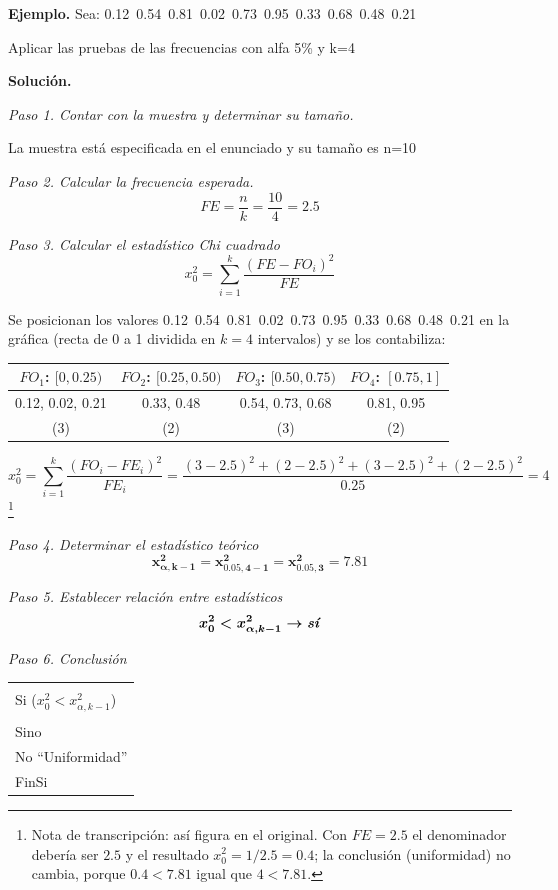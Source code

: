 \documentclass[11pt,letterpaper]{report}
\newenvironment{algoritmo}
  {\begin{center}\begin{tabular}{|p{0.85\textwidth}|}\hline\vspace{-0.2cm}\begin{tabbing}\hspace{0.6cm}\=\hspace{0.6cm}\=\hspace{0.6cm}\=\hspace{0.6cm}\=\hspace{0.6cm}\=\kill}
  {\end{tabbing}\vspace{-0.4cm}\\\hline\end{tabular}\end{center}}
\begin{document}
\textbf{Ejemplo.} Sea: 0.12\ 0.54\ 0.81\ 0.02\ 0.73\ 0.95\ 0.33\ 0.68\ 0.48\ 0.21

Aplicar las pruebas de las frecuencias con alfa 5\% y k=4

\textbf{Solución.}

\textit{Paso 1. Contar con la muestra y determinar su tamaño.}

La muestra está especificada en el enunciado y su tamaño es n=10

\textit{Paso 2. Calcular la frecuencia esperada.}
\[
FE = \frac{n}{k} = \frac{10}{4} = 2.5
\]

\textit{Paso 3. Calcular el estadístico Chi cuadrado}
\[
x_0^2 = \sum_{i=1}^{k} \frac{(FE - FO_i)^2}{FE}
\]

Se posicionan los valores 0.12\ 0.54\ 0.81\ 0.02\ 0.73\ 0.95\ 0.33\ 0.68\ 0.48\ 0.21 en la gráfica (recta de 0 a 1 dividida en $k = 4$ intervalos) y se los contabiliza:

\begin{table}[H]
\centering
\begin{tabular}{|c|c|c|c|}
\hline
$FO_1$: $[0, 0.25)$ & $FO_2$: $[0.25, 0.50)$ & $FO_3$: $[0.50, 0.75)$ & $FO_4$: $[0.75, 1]$\\
\hline
0.12, 0.02, 0.21 & 0.33, 0.48 & 0.54, 0.73, 0.68 & 0.81, 0.95\\
(3) & (2) & (3) & (2)\\
\hline
\end{tabular}
\end{table}

\[
x_0^2 = \sum_{i=1}^{k} \frac{(FO_i - FE_i)^2}{FE_i} = \frac{(3-2.5)^2 + (2-2.5)^2 + (3-2.5)^2 + (2-2.5)^2}{0.25} = 4
\]
\footnote{Nota de transcripción: así figura en el original. Con $FE = 2.5$ el denominador debería ser $2.5$ y el resultado $x_0^2 = 1/2.5 = 0.4$; la conclusión (uniformidad) no cambia, porque $0.4 < 7.81$ igual que $4 < 7.81$.}

\textit{Paso 4. Determinar el estadístico teórico}
\[
\boldsymbol{x_{\alpha,k-1}^2 = x_{0.05,4-1}^2 = x_{0.05,3}^2 = 7.81}
\]

\textit{Paso 5. Establecer relación entre estadísticos}
\[
\boldsymbol{x_0^2 < x_{\alpha,k-1}^2 \rightarrow \textbf{\textit{sí}}}
\]

\textit{Paso 6. Conclusión}

\begin{algoritmo}
\>$4 < 7.81$\\
\>Si ($x_0^2 < x_{\alpha,k-1}^2$)\\
\>\>\fbox{``Uniformidad''}\\
\>Sino\\
\>\>No ``Uniformidad''\\
\>FinSi
\end{algoritmo}
\end{document}
